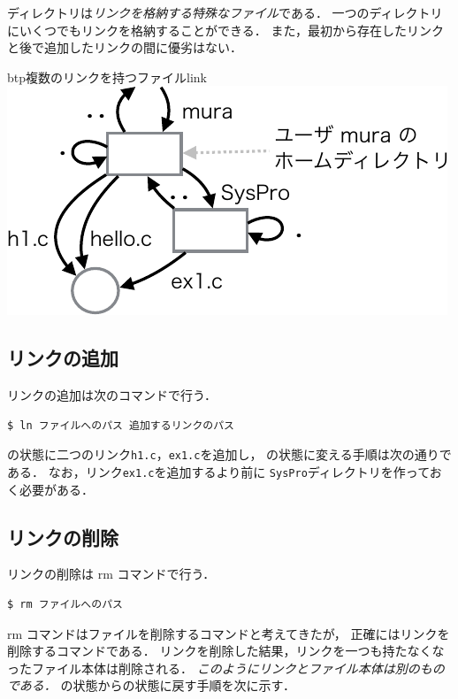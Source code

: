 ディレクトリは\emph{リンクを格納する特殊なファイル}である．
一つのディレクトリにいくつでもリンクを格納することができる．
また，最初から存在したリンクと後で追加したリンクの間に優劣はない．

\begin{myfig}{btp}{複数のリンクを持つファイル}{link}
\includegraphics[scale=1.0]{Fig/Link-crop.pdf}
\end{myfig}

\subsection*{リンクの追加}
リンクの追加は次のコマンドで行う．

\begin{lstlisting}[numbers=none]
$ ln ファイルへのパス 追加するリンクのパス
\end{lstlisting}

の状態に二つのリンク\texttt{h1.c}，\texttt{ex1.c}を追加し，
の状態に変える手順は次の通りである．
なお，リンク\texttt{ex1.c}を追加するより前に
\texttt{SysPro}ディレクトリを作っておく必要がある．



\subsection*{リンクの削除}

リンクの削除は rm コマンドで行う．

\begin{lstlisting}[numbers=none]
$ rm ファイルへのパス
\end{lstlisting}

rm コマンドはファイルを削除するコマンドと考えてきたが，
正確にはリンクを削除するコマンドである．
リンクを削除した結果，リンクを一つも持たなくなったファイル本体は削除される．
\emph{このようにリンクとファイル本体は別のものである．}
の状態からの状態に戻す手順を次に示す．


